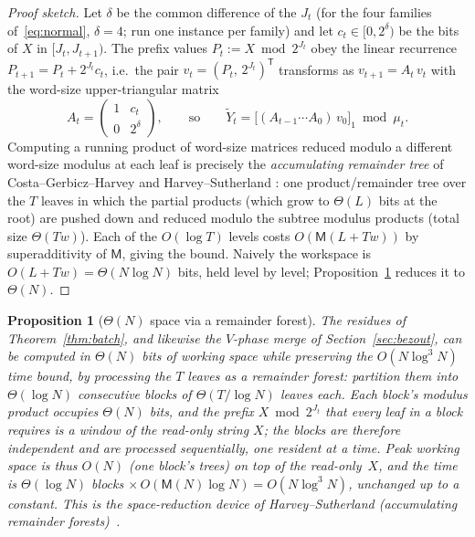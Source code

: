 \documentclass[11pt]{article}
\newtheorem{proposition}[theorem]{Proposition}
\theoremstyle{remark}
\theoremstyle{definition}
\newcommand{\M}{\mathsf{M}}
\begin{document}
\begin{proof}[Proof sketch]
Let $\delta$ be the common difference of the $J_t$ (for the four families
of~\eqref{eq:normal}, $\delta=4$; run one instance per family) and let
$c_t\in[0,2^{\delta})$ be the bits of $X$ in $[J_t,J_{t+1})$. The prefix
values $P_t:=X\bmod 2^{J_t}$ obey the linear recurrence
$P_{t+1}=P_t+2^{J_t}c_t$, i.e.\ the pair $v_t=(P_t,\,2^{J_t})^{\mathsf T}$
transforms as $v_{t+1}=A_t\,v_t$ with the word-size upper-triangular matrix
\[
A_t=\begin{pmatrix}1 & c_t\\ 0 & 2^{\delta}\end{pmatrix},
\qquad\text{so}\qquad
\widetilde{Y}_t=\bigl[(A_{t-1}\cdots A_0)\,v_0\bigr]_1 \bmod \mu_t .
\]
Computing a running product of word-size matrices reduced modulo a
different word-size modulus at each leaf is precisely the
\emph{accumulating remainder tree} of Costa--Gerbicz--Harvey and
Harvey--Sutherland \cite{CGH14,HS14}: one product/remainder tree over the
$T$ leaves in which the partial products (which grow to $\Theta(L)$ bits at
the root) are pushed down and reduced modulo the subtree modulus products
(total size $\Theta(Tw)$). Each of the $O(\log T)$ levels costs
$O(\M(L+Tw))$ by superadditivity of $\M$, giving the bound. Naively the
workspace is $O(L+Tw)=\Theta(N\log N)$ bits, held level by level;
Proposition~\ref{prop:forest} reduces it to $\Theta(N)$.
\end{proof}

\begin{proposition}[$\Theta(N)$ space via a remainder forest]\label{prop:forest}
The residues of Theorem~\ref{thm:batch}, and likewise the $V$-phase merge of
Section~\ref{sec:bezout}, can be computed in $\Theta(N)$ bits of working space
while preserving the $O(N\log^{3}N)$ time bound, by processing the $T$ leaves
as a \emph{remainder forest}: partition them into $\Theta(\log N)$ consecutive
blocks of $\Theta(T/\log N)$ leaves each. Each block's modulus product occupies
$\Theta(N)$ bits, and the prefix $X\bmod 2^{J_t}$ that every leaf in a block
requires is a window of the read-only string $X$; the blocks are therefore
independent and are processed sequentially, one resident at a time. Peak
working space is thus $O(N)$ (one block's trees) on top of the read-only~$X$,
and the time is $\Theta(\log N)$ blocks $\times\,O(\M(N)\log N)=O(N\log^{3}N)$,
unchanged up to a constant. This is the space-reduction device of
Harvey--Sutherland (accumulating remainder \emph{forests})~\cite{HS14}.
\end{proposition}
\end{document}
